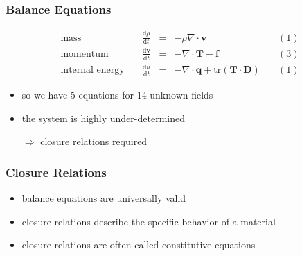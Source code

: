 \documentclass[hide notes,intlimits]{beamer}
\begin{document}
\begin{frame}
  \frametitle{Balance Equations}
  \large{
  \begin{equation*}
  \begin{array}{lcclc}
    \text{mass} \quad &  \frac{\text{d} \rho}{\text{d} t} & = & -\rho\nabla \cdot \mathbf{v} \quad & (1)\\[.25em]
    \text{momentum} \quad & \frac{\text{d} \mathbf{v}}{\text{d} t} & = & -\nabla \cdot \mathbf{T} - \mathbf{f} \quad & (3) \\[.25em]
    \text{internal energy} \quad & \frac{\text{d} u}{\text{d} t} & = & - \nabla \cdot \mathbf{q} + \text{tr} \left(\mathbf{T}\cdot\mathbf{D}\right) \quad & (1)
  \end{array}
  \end{equation*}
  }
  \begin{itemize}
   \item so we have 5 equations for 14 unknown fields
   \item the system is highly under-determined
   \item[$\Rightarrow$] \alert{closure relations} required
 \end{itemize}
\end{frame}


\begin{frame}
  \frametitle{Closure Relations}
  \begin{itemize}
    \item \alert{balance equations} are universally valid
    \item \alert{closure relations} describe the specific behavior of a material
    \item \alert{closure relations} are often called \alert{constitutive equations}
  \end{itemize}
\end{frame}
\end{document}
